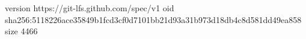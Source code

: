 version https://git-lfs.github.com/spec/v1
oid sha256:5118226ace35849b1fcd3cf0d7101bb21d93a31b973d18db4c8d581dd49ea858
size 4466
